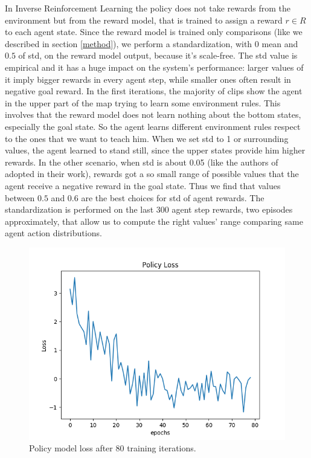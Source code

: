 In Inverse Reinforcement Learning the policy does not take rewards from the environment but from the reward model, that is trained to assign a reward $r\in R$ to each agent state. Since the reward model is trained only comparisons (like we described in section \ref{method}), we perform a standardization, with $0$ mean and $0.5$ of std, on the reward model output, because it's scale-free. The std value is empirical and it has a huge impact on the system's performance: larger values of it imply bigger rewards in every agent step, while smaller ones often result in negative goal reward. In the first iterations, the majority of clips show the agent in the upper part of the map trying to learn some environment rules. This involves that the reward model does not learn nothing about the bottom states, especially the goal state. So the agent learns different environment rules respect to the ones that we want to teach him.
When we set std to 1 or surrounding values, the agent learned to stand still, since the upper states provide him higher rewards. In the other scenario, when std is about 0.05 (like the authors of \cite{NIPS2018_8025} adopted in their work), rewards got a so small range of possible values that the agent receive a negative reward in the goal state. Thus we find that values between $0.5$ and $0.6$ are the best choices for std of agent rewards. 
The standardization is performed on the last 300 agent step rewards, two episodes approximately, that allow us to compute the right values' range comparing same agent action distributions.

\begin{figure}[t]
    \centering
    \includegraphics[width=\linewidth]{data/policy_loss_80.png} 
    \caption{Policy model loss after 80 training iterations.}
	\label{fig:losspolicy}%
\end{figure}


